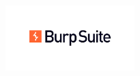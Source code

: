 \documentclass[
	a4paper, %
	12pt, %
]{CSSullivanBusinessReport}
\begin{document}

\thispagestyle{empty} %

\begin{fullwidth} %
	\vspace*{-0.075\textheight} %
	
	\hfill\includegraphics[width=5cm]{Images/burpsuite.png} %

	\vspace{0.15\textheight} %

	\parbox{0.9\fulltextwidth}{\fontsize{50pt}{52pt}\selectfont\raggedright\textbf{\reporttitle}\par} %
	
	\vspace{0.03\textheight} %
	
	{\LARGE\textit{\textbf{\reportsubtitle}}\par} %
	
	\vfill %
	
	{\Large\reportauthors\par} %
	
	\vfill\vfill\vfill %
	
	{\large\reportdate\par} %
\end{fullwidth}

\newpage


\thispagestyle{empty} %
\end{document}
